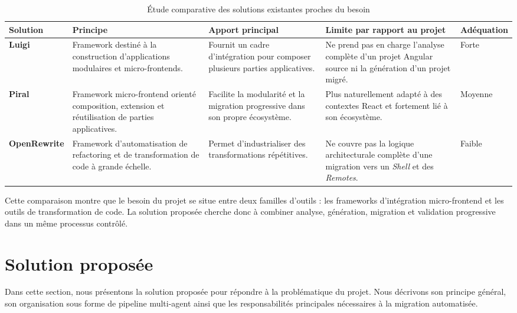 \begingroup
\small
\renewcommand{\arraystretch}{1.2}
\setlength{\tabcolsep}{3pt}
\begin{longtable}{|>{\raggedright\arraybackslash}p{2.2cm}|>{\raggedright\arraybackslash}p{3.05cm}|>{\raggedright\arraybackslash}p{3.05cm}|>{\raggedright\arraybackslash}p{3.05cm}|>{\centering\arraybackslash}p{1.7cm}|}
\caption{Étude comparative des solutions existantes proches du besoin}\label{tab:etude_existant_microfrontend}\\
\hline
\textbf{Solution} & \textbf{Principe} & \textbf{Apport principal} & \textbf{Limite par rapport au projet} & \textbf{Adéquation} \\
\hline
\textbf{Luigi} \cite{luigi} & Framework destiné à la construction d'applications modulaires et micro-frontends. & Fournit un cadre d'intégration pour composer plusieurs parties applicatives. & Ne prend pas en charge l'analyse complète d'un projet Angular source ni la génération d'un projet migré. & Forte \\
\hline
\textbf{Piral} \cite{piral_migration} & Framework micro-frontend orienté composition, extension et réutilisation de parties applicatives. & Facilite la modularité et la migration progressive dans son propre écosystème. & Plus naturellement adapté à des contextes React et fortement lié à son écosystème. & Moyenne \\
\hline
\textbf{OpenRewrite} \cite{openrewrite} & Framework d'automatisation de refactoring et de transformation de code à grande échelle. & Permet d'industrialiser des transformations répétitives. & Ne couvre pas la logique architecturale complète d'une migration vers un \textit{Shell} et des \textit{Remotes}. & Faible \\
\hline
\end{longtable}
\endgroup

Cette comparaison montre que le besoin du projet se situe entre deux familles d'outils : les frameworks d'intégration micro-frontend et les outils de transformation de code. La solution proposée cherche donc à combiner analyse, génération, migration et validation progressive dans un même processus contrôlé.

\section{Solution proposée}

Dans cette section, nous présentons la solution proposée pour répondre à la problématique du projet. Nous décrivons son principe général, son organisation sous forme de pipeline multi-agent ainsi que les responsabilités principales nécessaires à la migration automatisée.

